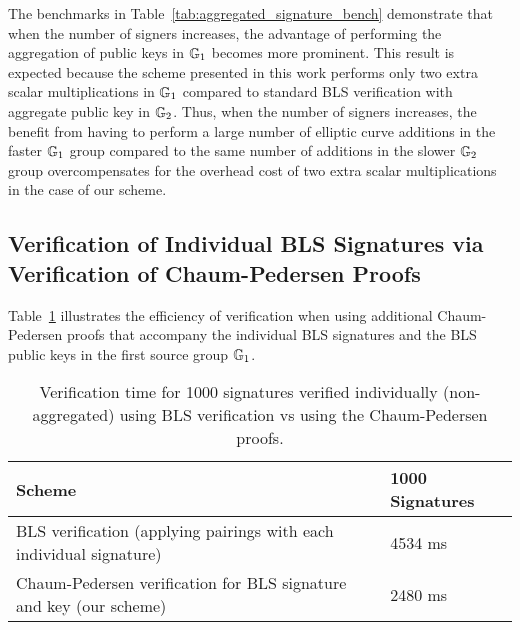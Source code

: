 The benchmarks in Table~\ref{tab:aggregated_signature_bench} demonstrate that when the number of signers increases, the advantage of performing the aggregation of public keys in $\mathbb{G}_{1}$ becomes more prominent. 
This result is expected because the scheme presented in this work performs only two extra scalar multiplications in $\mathbb{G}_{1}$ compared to standard BLS verification with aggregate public key in $\mathbb{G}_{2}$. 
Thus, when the number of signers increases, the benefit from having to perform a large number of elliptic curve additions in the faster $\mathbb{G}_{1}$ group compared to the same number of 
additions in the slower $\mathbb{G}_{2}$ group overcompensates for the overhead cost of two extra scalar multiplications in the case of our scheme. 

\subsection{Verification of Individual  BLS Signatures via Verification of Chaum-Pedersen Proofs}
\label{sec:benchmark_chaum_pederson_verify}

Table~\ref{tab:individual_signature_bench} illustrates the efficiency of verification when using additional Chaum-Pedersen proofs that accompany the individual BLS signatures and the BLS public keys in the first source group $\mathbb{G}_{1}$.

\begin{table}[h!]
\begin{tabular}{| l | l |}

\hline

\textbf{Scheme} & \textbf{1000 Signatures} 	 \\
\hline
BLS verification (applying pairings with each individual signature)   & 4534 ms \\
\hline
Chaum-Pedersen verification for BLS signature and key (our scheme)   & 2480 ms \\
\hline
\end{tabular}
\caption{Verification time for 1000 signatures verified individually (non-aggregated) using  BLS verification vs using the Chaum-Pedersen proofs.}
\label{tab:individual_signature_bench}
\end{table}

